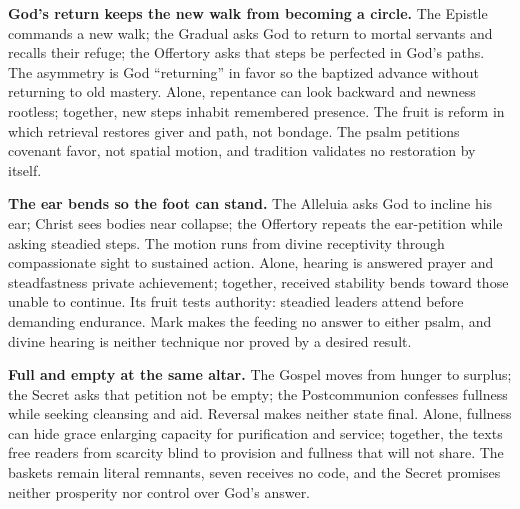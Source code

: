 \noindent\textbf{God's return keeps the new walk from becoming a circle.\enspace{}}
The Epistle commands a new walk; the Gradual asks God to return to mortal servants and recalls their refuge; the Offertory asks that steps be perfected in God's paths. The asymmetry is God ``returning'' in favor so the baptized advance without returning to old mastery. Alone, repentance can look backward and newness rootless; together, new steps inhabit remembered presence. The fruit is reform in which retrieval restores giver and path, not bondage. The psalm petitions covenant favor, not spatial motion, and tradition validates no restoration by itself.

\noindent\textbf{The ear bends so the foot can stand.\enspace{}}
The Alleluia asks God to incline his ear; Christ sees bodies near collapse; the Offertory repeats the ear-petition while asking steadied steps. The motion runs from divine receptivity through compassionate sight to sustained action. Alone, hearing is answered prayer and steadfastness private achievement; together, received stability bends toward those unable to continue. Its fruit tests authority: steadied leaders attend before demanding endurance. Mark makes the feeding no answer to either psalm, and divine hearing is neither technique nor proved by a desired result.

\noindent\textbf{Full and empty at the same altar.\enspace{}}
The Gospel moves from hunger to surplus; the Secret asks that petition not be empty; the Postcommunion confesses fullness while seeking cleansing and aid. Reversal makes neither state final. Alone, fullness can hide grace enlarging capacity for purification and service; together, the texts free readers from scarcity blind to provision and fullness that will not share. The baskets remain literal remnants, seven receives no code, and the Secret promises neither prosperity nor control over God's answer.
